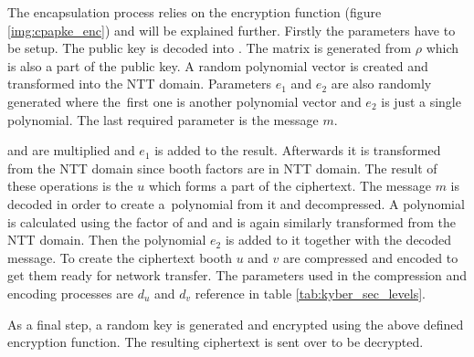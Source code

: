The encapsulation process relies on the encryption function (figure \ref{img:cpapke_enc}) and will be explained further. Firstly the parameters have to be setup. The public key is decoded into . The matrix  is generated from $\rho$ which is also a part of the public key. A random polynomial vector  is created and transformed into the NTT domain. Parameters $e_1$ and $e_2$ are also randomly generated where the~first one is another polynomial vector and $e_2$ is just a single polynomial. The last required parameter is the message $m$.

 and  are multiplied and $e_1$ is added to the result. Afterwards it is transformed from the NTT domain since booth factors are in NTT domain. The result of these operations is the $u$ which forms a part of the ciphertext. The message $m$ is decoded in order to create a~polynomial from it and decompressed. A polynomial is calculated using the factor of  and  and is again similarly transformed from the NTT domain. Then the polynomial $e_2$ is added to it together with the decoded message. To create the ciphertext booth $u$ and $v$ are compressed and encoded to get them ready for network transfer. The parameters used in the compression and encoding processes are $d_u$ and $d_v$ reference in table \ref{tab:kyber_sec_levels}.


As a final step, a random key is generated and encrypted using the above defined encryption function. The resulting ciphertext is sent over to be decrypted.
